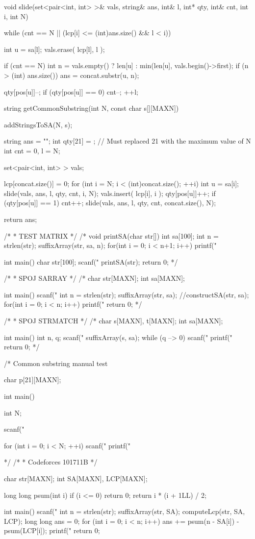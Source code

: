 \documentclass[11pt]{article}
\begin{document}
\begin{vncode}
void slide(set<pair<int, int> >& vals, string& ans, int& l, int* qty, int& cnt, int i, int N) {
	while (cnt == N || (lcp[i] <= (int)ans.size() && l < i)) {
		int u = sa[l];
		vals.erase({ lcp[l], l });

		if (cnt == N) {
			int n = vals.empty() ? len[u] : min(len[u], vals.begin()->first);
			if (n > (int) ans.size()) ans = concat.substr(u, n);
		}

		qty[pos[u]]--;
		if (qty[pos[u]] == 0) cnt--;
		++l;
	}
}

string getCommonSubstring(int N, const char s[][MAXN]) {
	addStringsToSA(N, s);

	string ans = "";
	int qty[21] = {}; // Must replaced 21 with the maximum value of N
	int cnt = 0, l = N;

	set<pair<int, int> > vals;

	lcp[concat.size()] = 0;
	for (int i = N; i < (int)concat.size(); ++i) {
		int u = sa[i];
		slide(vals, ans, l, qty, cnt, i, N);
		vals.insert({ lcp[i], i });
		qty[pos[u]]++;
		if (qty[pos[u]] == 1) cnt++;
	}
	slide(vals, ans, l, qty, cnt, concat.size(), N);

	return ans;
}

/*
 * TEST MATRIX
 */
 /*
 void printSA(char str[]) {
	 int sa[100];
	 int n = strlen(str);
	 suffixArray(str, sa, n);
	 for(int i = 0; i < n+1; i++) {
		 printf("%
	 }
 }

 int main() {
	 char str[100];
	 scanf("%
	 printSA(str);
	 return 0;
 }*/

 /*
  * SPOJ SARRAY
  */
  /*
  char str[MAXN];
  int sa[MAXN];

  int main() {
	  scanf(" %
	  int n = strlen(str);
	  suffixArray(str, sa);
	  //constructSA(str, sa);
	  for(int i = 0; i < n; i++) {
		  printf("%
	  }
	  return 0;
  }*/

  /*
   * SPOJ STRMATCH
   */
   /*
   char s[MAXN], t[MAXN];
   int sa[MAXN];

   int main() {
	   int n, q;
	   scanf("%
	   suffixArray(s, sa);
	   while (q --> 0) {
		   scanf(" %
		   printf("%
	   }
	   return 0;
   }*/

	/*
	Common substring manual test

	char p[21][MAXN];

	int main() {
		int N;

		scanf("%

		for (int i = 0; i < N; ++i) {
			scanf("%
		}
		printf("%
	}
	*/
   /*
	* Codeforces 101711B
	*/

char str[MAXN];
int SA[MAXN], LCP[MAXN];

long long psum(int i) {
	if (i <= 0) return 0;
	return i * (i + 1LL) / 2;
}

int main() {
	scanf("%
	int n = strlen(str);
	suffixArray(str, SA);
	computeLcp(str, SA, LCP);
	long long ans = 0;
	for (int i = 0; i < n; i++) {
		ans += psum(n - SA[i]) - psum(LCP[i]);
	}
	printf("%
	return 0;
}
\end{vncode}
\endgroup
\end{document}
